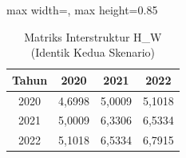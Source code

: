 \begin{table}[H]
\centering
\caption{Matriks Interstruktur H\_W (Identik Kedua Skenario)} \label{tab:sampleh_w}
\begin{adjustbox}{max width=\textwidth, max height=0.85\textheight}
\begin{tabular}{|c|c|c|c|}
\hline
\textbf{Tahun} & \textbf{2020} & \textbf{2021} & \textbf{2022} \\
\hline
2020 & 4,6998 & 5,0009 & 5,1018 \\
2021 & 5,0009 & 6,3306 & 6,5334 \\
2022 & 5,1018 & 6,5334 & 6,7915 \\
\hline
\end{tabular}
\end{adjustbox}
\end{table}